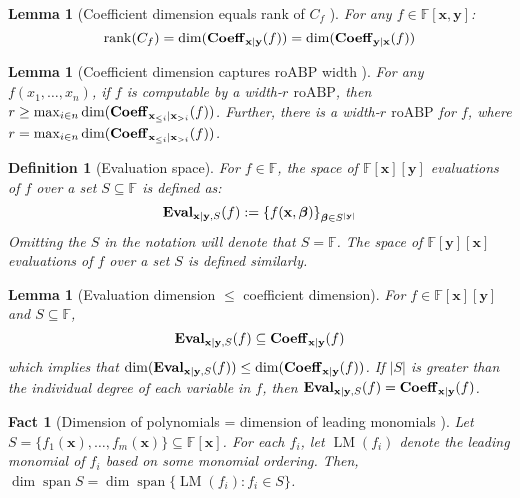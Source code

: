 \documentclass[11pt]{article}
\newtheorem{lemma}[theorem]{Lemma}
\newtheorem{definition}[theorem]{Definition}
\newtheorem{fact}[theorem]{Fact}
\newcommand{\F}{\mathbb{F}}
\newcommand{\roABP}{\mathrm{roABP}}
\begin{document}
\begin{lemma}[Coefficient dimension equals rank of $C_f$ \cite{Nisan}]
    For any $f \in \F[\mathbf{x},\mathbf{y}]$: $$ \operatorname{rank}(C_f) = \dim(\operatorname{\mathbf{Coeff}}_{\mathbf{x}|\mathbf{y}}(f)) = \dim(\operatorname{\mathbf{Coeff}}_{\mathbf{y}|\mathbf{x}}(f))$$
\end{lemma}

\begin{lemma}[Coefficient dimension captures $\roABP$ width \cite{Nisan}\cite{Forbes-thesis}]\label{lem: nisan roabp width}
    For any $f(x_1, \dots, x_n)$, if $f$ is computable by a width-$r$ $\roABP$, then $r \geq \max_{i\in n} \dim(\operatorname{\mathbf{Coeff}}_{\mathbf{x}_{\leq i}|\mathbf{x}_{> i}}(f))$. Further, there is a width-$r$ $\roABP$ for $f$, where $r = \max_{i\in n} \dim(\operatorname{\mathbf{Coeff}}_{\mathbf{x}_{\leq i}|\mathbf{x}_{> i}}(f))$.
\end{lemma}

\begin{definition}[Evaluation space]
    For $f\in \F$, the \emph{space of $\F[\mathbf{x}][\mathbf{y}]$ evaluations of $f$ over a set $S\subseteq \F$} is defined as: $$ \operatorname{\mathbf{Eval}}_{\mathbf{x}|\mathbf{y},S}(f) := \left\{ f(\mathbf{x},\boldsymbol{\beta}) \right\}_{\boldsymbol{\beta}\in S^{|\mathbf{y}|}}$$ 
    Omitting the $S$ in the notation will denote that $S = \F$. The \emph{space of $\F[\mathbf{y}][\mathbf{x}]$ evaluations of $f$ over a set $S$} is defined similarly. 
\end{definition}

\begin{lemma}[Evaluation dimension $\leq$ coefficient dimension]\label{lem:coeff vs eval}
    For $f\in \F[\mathbf{x}][\mathbf{y}]$ and $S\subseteq \F$, $$\operatorname{\mathbf{Eval}}_{\mathbf{x}|\mathbf{y},S}(f) \subseteq \operatorname{\mathbf{Coeff}}_{\mathbf{x}|\mathbf{y}}(f)$$ which implies that $\dim(\operatorname{\mathbf{Eval}}_{\mathbf{x}|\mathbf{y},S}(f)) \leq \dim(\operatorname{\mathbf{Coeff}}_{\mathbf{x}|\mathbf{y}}(f))$. If $|S|$ is greater than the individual degree of each variable in $f$, then $\operatorname{\mathbf{Eval}}_{\mathbf{x}|\mathbf{y},S}(f) = \operatorname{\mathbf{Coeff}}_{\mathbf{x}|\mathbf{y}}(f)$.
\end{lemma}

\begin{fact}[Dimension of polynomials = dimension of leading monomials \cite{Forbes-thesis}]\label{fact:dim of leading monomials}
    Let $S = \{f_1(\mathbf{x}), \dots, f_m(\mathbf{x})\} \subseteq \F[\mathbf{x}]$. For each $f_i$, let $\operatorname{LM}(f_i)$ denote the leading monomial of $f_i$ based on some monomial ordering. Then, $\dim \operatorname{span} S = \dim \operatorname{span}\{\operatorname{LM}(f_i): f_i \in S\}$.
\end{fact}
\end{document}
